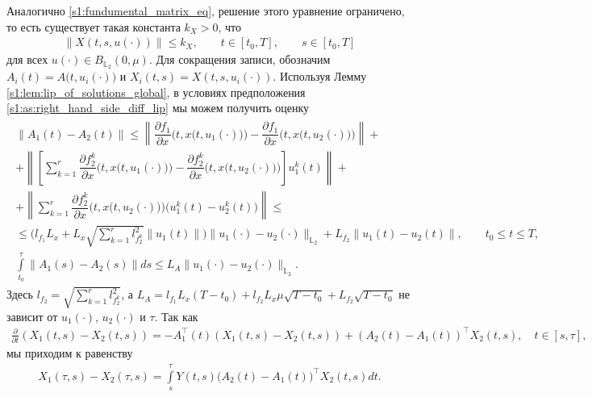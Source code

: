 \documentclass[../main.tex]{subfiles}
\begin{document}
Аналогично \eqref{s1:fundumental_matrix_eq}, решение этого уравнение ограничено, то есть существует такая константа $k_X>0$, что
\begin{gather*}
 \| X(t,s, u(\cdot)) \| \leqslant k_X, \qquad t \in [t_0,T], \qquad s \in [t_0,T]
\end{gather*}
для всех $u(\cdot) \in B_{\mathbb{L}_2}(0,\mu)$. 
Для сокращения записи, обозначим $A_i(t) = A\big(t, u_i(\cdot)\big) $ и $ X_i(t,s) = X(t, s, u_i(\cdot))$. 
Используя Лемму \ref{s1:lem:lip_of_solutions_global}, в условиях предположения \ref{s1:as:right_hand_side_diff_lip} мы можем получить оценку
\begin{gather}\label{s1:lip_a}
\begin{gathered}
 \| A_1(t) - A_2(t) \| \leqslant 
 \left\| 
 \dfrac{\partial f_1}{\partial x} \Big(t,x\big(t,u_1(\cdot)\big)\Big) 
 - 
 \dfrac{\partial f_1}{\partial x} \Big(t,x\big(t,u_2(\cdot)\big)\Big) 
 \right\| 
 + \\ +
 \left\| 
 \left[ 
 \sum\limits_{k=1}^r 
 \dfrac{\partial f_2^k}{\partial x}\Big(t,x\big(t,u_1(\cdot)\big)\Big) 
 - 
 \dfrac{\partial f_2^k}{\partial x}\Big(t,x\big(t,u_2(\cdot)\big)\Big)
 \right] 
 u_1^k(t) 
 \right\| 
 + \\ +
 \left\| 
 \sum\limits_{k=1}^r 
 \dfrac{\partial f_2^k}{\partial x}\Big(t,x\big(t,u_2(\cdot)\big)\Big)
 \Big(u_1^k(t) - u_2^k(t)\Big) 
 \right\| 
 \leqslant \\ \leqslant
 \Big(l_{f_1} L_x + L_x \sqrt{\sum\limits_{k=1}^r l_{f_2^k}^2} \|u_1(t) \|\Big) \| u_1(\cdot) - u_2(\cdot) \|_{\mathbb{L}_2} + L_{f_2} \| u_1(t) - u_2(t) \|, \qquad t_0 \leqslant t \leqslant T,\\
 \int\limits_{t_0}^{\tau} \|A_1(s) - A_2(s) \| ds \leqslant L_A \| u_1(\cdot) - u_2(\cdot) \|_{\mathbb{L}_2}. 
\end{gathered}
\end{gather}
Здесь $l_{f_2} = \sqrt{\sum\limits_{k=1}^r l_{f_2^k}^2}$, а $L_A = l_{f_1} L_x (T - t_0) + l_{f_2} L_x \mu \sqrt{T - t_0} + L_{f_2} \sqrt{T - t_0}$ не зависит от $u_1(\cdot)$, $u_2(\cdot)$ и $\tau$.
Так как
\begin{gather*}
 \frac{\partial}{\partial t} \left(X_1(t,s) - X_2(t,s) \right) = -A_1^{\top}(t) \left(X_1(t,s) - X_2(t,s) \right) + (A_2(t) - A_1(t))^{\top} X_2(t,s), \quad t \in [s,\tau], 
\end{gather*}
мы приходим к равенству
\begin{gather*}
 X_1(\tau,s) - X_2(\tau,s) = \int\limits_s^{\tau} Y(t,s) \big(A_2(t) - A_1(t)\big)^{\top} X_2(t,s) dt.
\end{gather*}
\end{document}
